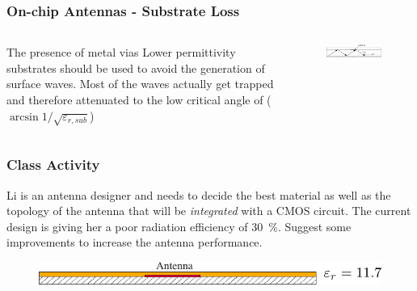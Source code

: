 \documentclass[10pt]{beamer}
\newcommand{\E}{\varepsilon}  %
\begin{document}
\begin{frame}
    \frametitle{On-chip Antennas - Substrate Loss}
    \begin{columns}
        \begin{column}{.5\textwidth}
            \begin{outline}
                \1 The presence of metal vias
                \1 Lower permittivity substrates should be used to avoid the generation of surface waves.
                \1 Most of the waves actually get trapped and therefore attenuated to the low critical angle of  ($\arcsin 1/\sqrt{\E_{r,sub}}$)
            \end{outline}
        \end{column}
        \begin{column}{.5\textwidth}
            \begin{figure}[]
                \centering
                \includegraphics[width=1\textwidth]{surface_waves_onchipantennas.pdf}
                \label{fig:meta_vias}
            \end{figure}
        \end{column}
    \end{columns}
\end{frame}

\begin{frame}
    \frametitle{Class Activity}

    Li is an antenna designer and needs to decide the best material as well as the topology of the antenna that will be \textit{integrated} with a CMOS circuit. The current design is giving her a poor radiation efficiency of \SI{30}{\percent}. Suggest some improvements to increase the antenna performance.

    \begin{figure}[h!]
        \centering
        \includegraphics[width=.75\textwidth]{exercise.pdf}
    \end{figure}
\end{frame}
\end{document}
